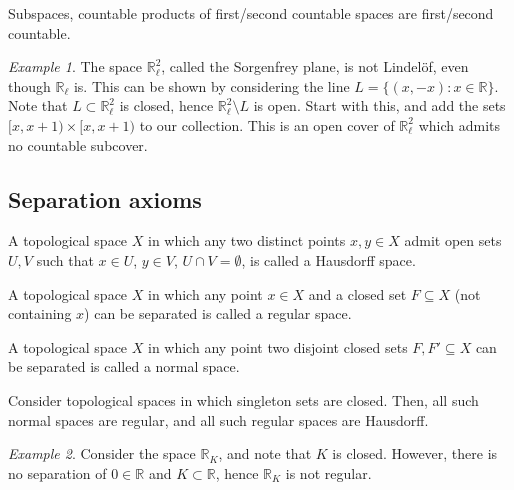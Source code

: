 \documentclass[11pt]{article}
\newcommand{\R}{\mathbb{R}}
\theoremstyle{definition}
\theoremstyle{remark}
\newtheorem*{example}{Example}
\numberwithin{equation}{section}
\begin{document}
    \begin{lemma}
        Subspaces, countable products of first/second countable spaces are
        first/second countable.
    \end{lemma}

    \begin{example}
        The space $\R_\ell^2$, called the Sorgenfrey plane, is not Lindel\"of, even
        though $\R_\ell$ is. This can be shown by considering the line $L = \{(x,
        -x): x \in \R\}$. Note that $L \subset \R_\ell^2$ is closed, hence $\R_\ell^2
        \setminus L$ is open. Start with this, and add the sets $[x, x + 1)\times [x,
        x + 1)$ to our collection. This is an open cover of $\R_\ell^2$ which admits
        no countable subcover.
    \end{example}


    \subsection{Separation axioms}

    \begin{definition}
        A topological space $X$ in which any two distinct points $x, y \in X$ admit
        open sets $U, V$ such that $x \in U$, $y \in V$, $U \cap V = \emptyset$, is
        called a Hausdorff space.
    \end{definition}

    \begin{definition}
        A topological space $X$ in which any point $x \in X$ and a closed set
        $F\subseteq X$ (not containing $x$) can be separated is called a regular
        space.
    \end{definition}
    
    \begin{definition}
        A topological space $X$ in which any point two disjoint closed sets $F, F'
        \subseteq X$ can be separated is called a normal space.
    \end{definition}

    \begin{lemma}
        Consider topological spaces in which singleton sets are closed. Then, all
        such normal spaces are regular, and all such regular spaces are Hausdorff.
    \end{lemma}

    \begin{example}
        Consider the space $\R_K$, and note that $K$ is closed. However, there is no
        separation of $0 \in \R$ and $K \subset \R$, hence $\R_K$ is not regular.
    \end{example}
\end{document}
